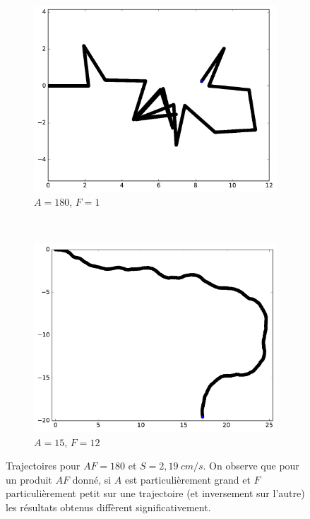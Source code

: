 	\begin{figure}[htb]
		\begin{subfigure}[t]{0.49\textwidth}
			\centering
			\includegraphics[width=\textwidth]{figures/ch3/synTraj_219_180_1}
			\caption[$A = 180$, $F=1$]{$A = 180$, $F=1$}
			\label{fig:synTraj_219_180_1b}
		\end{subfigure}
		~
		\begin{subfigure}[t]{0.49\textwidth}
			\centering
			\includegraphics[width=\textwidth]{figures/ch3/synTraj_219_15_12}
			\caption[$A = 15$, $F=12$]{$A = 15$, $F=12$}
			\label{fig:synTraj_219_15_12}
		\end{subfigure}
		\caption[Trajectoires pour $AF = 180$]{Trajectoires pour $AF = 180$ et $S = 2,19~cm/s$. On observe que pour un produit $AF$ donné, si $A$ est particulièrement grand et $F$ particulièrement petit sur une trajectoire (et inversement sur l'autre) les résultats obtenus diffèrent significativement.}
		\label{fig:trajsAF180}
	\end{figure}
	
